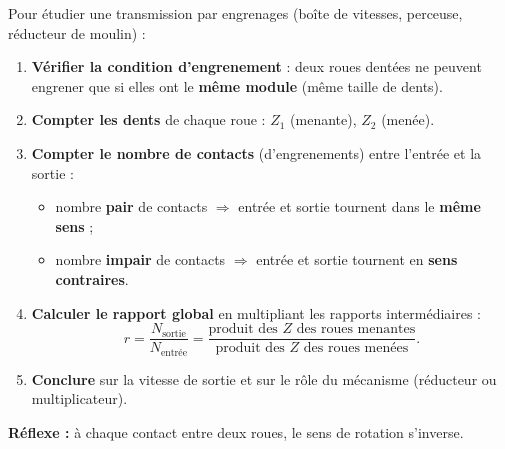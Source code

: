 \documentclass[11pt]{article}
\begin{document}
\begin{methode}
Pour étudier une transmission par engrenages (boîte de vitesses, perceuse, réducteur de moulin) :
\begin{enumerate}
\item \textbf{Vérifier la condition d'engrenement} : deux roues dentées ne peuvent engrener que si elles ont le \textbf{même module} (même taille de dents).
\item \textbf{Compter les dents} de chaque roue : $Z_1$ (menante), $Z_2$ (menée).
\item \textbf{Compter le nombre de contacts} (d'engrenements) entre l'entrée et la sortie :
\begin{itemize}
\item nombre \textbf{pair} de contacts $\Rightarrow$ entrée et sortie tournent dans le \textbf{même sens} ;
\item nombre \textbf{impair} de contacts $\Rightarrow$ entrée et sortie tournent en \textbf{sens contraires}.
\end{itemize}
\item \textbf{Calculer le rapport global} en multipliant les rapports intermédiaires :
\[ r = \frac{N_{\text{sortie}}}{N_{\text{entrée}}} = \frac{\text{produit des } Z \text{ des roues menantes}}{\text{produit des } Z \text{ des roues menées}}. \]
\item \textbf{Conclure} sur la vitesse de sortie et sur le rôle du mécanisme (réducteur ou multiplicateur).
\end{enumerate}
\textbf{Réflexe :} à chaque contact entre deux roues, le sens de rotation s'inverse.
\end{methode}
\end{document}
